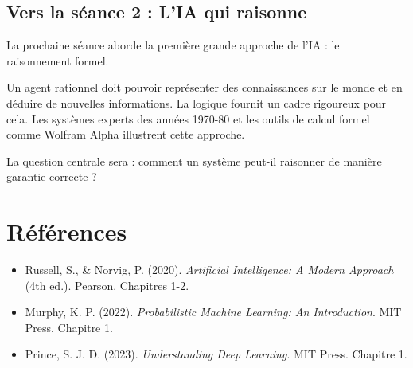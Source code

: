\documentclass[11pt,a4paper]{article}
\begin{document}
\subsection{Vers la séance 2 : L'IA qui raisonne}

La prochaine séance aborde la première grande approche de l'IA : le raisonnement formel. 

Un agent rationnel doit pouvoir représenter des connaissances sur le monde et en déduire de nouvelles informations. La logique fournit un cadre rigoureux pour cela. Les systèmes experts des années 1970-80 et les outils de calcul formel comme Wolfram Alpha illustrent cette approche.

La question centrale sera : comment un système peut-il raisonner de manière garantie correcte ?

\section*{Références}

\begin{itemize}
    \item Russell, S., \& Norvig, P. (2020). \textit{Artificial Intelligence: A Modern Approach} (4th ed.). Pearson. Chapitres 1-2.
    \item Murphy, K. P. (2022). \textit{Probabilistic Machine Learning: An Introduction}. MIT Press. Chapitre 1.
    \item Prince, S. J. D. (2023). \textit{Understanding Deep Learning}. MIT Press. Chapitre 1.
\end{itemize}
\end{document}

